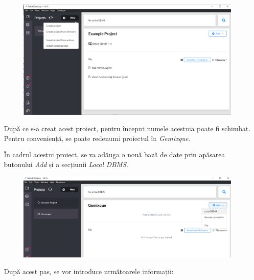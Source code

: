 \documentclass[12pt,a4paper]{report}
\begin{document}
\begin{enumerate}
\begin{figure}[H]
\centering
\caption{}
\begin{adjustbox}{max size={\textwidth}{\textheight}}
\includegraphics[scale=1]{exemplu_42_new_project}
\end{adjustbox}
\caption*{}
\end{figure}

  După ce s-a creat acest proiect, pentru început numele acestuia poate fi schimbat. Pentru conveniență, se poate redenumi proiectul în \emph{Gemixque}.
  
  În cadrul acestui proiect, se va adăuga o nouă bază de date prin apăsarea butonului \emph{Add} și a secțiunii \emph{Local DBMS}.
  
\begin{figure}[H]
\centering
\caption{}
\begin{adjustbox}{max size={\textwidth}{\textheight}}
\includegraphics[scale=1]{exemplu_43_new_database}
\end{adjustbox}
\caption*{}
\end{figure}

\newpage
  După acest pas, se vor introduce următoarele informații:
  

\end{enumerate}
\end{document}

